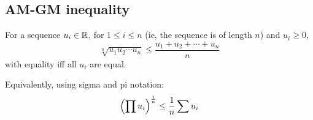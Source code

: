 \subsection{AM-GM inequality}

\begin{theorem}[AM-GM inequality]
For a sequence \(u_i \in \mathbb R\), for \(1 \le i \le n\) (ie, the
sequence is of length \(n\)) and \(u_i \ge 0\),
\begin{equation*}
\sqrt[n]{u_1 u_2 \dotsm u_n} \le \frac{u_1 + u_2 + \dotsb + u_n}{n}
\end{equation*}
with equality iff all \(u_i\) are equal.

Equivalently, using sigma and pi notation:
\begin{equation*}
\pqty{\prod u_i}^\frac{1}{n} \le \frac{1}{n}\sum u_i
\end{equation*}
\end{theorem}
